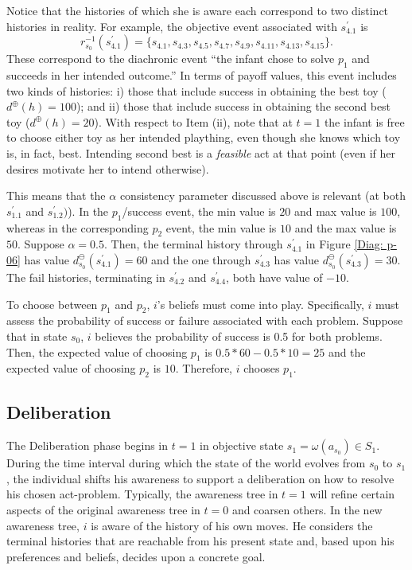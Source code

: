 \documentclass[
11pt,
titlepage,
reqno,
]{article}%
\theoremstyle{definition}
\begin{document}
Notice that the histories of which she is aware each correspond to two distinct histories in reality.
For example, the objective event associated with $s_{4.1}^\prime$ is
\[ 
	r^{-1}_{s_0}(s_{4.1}^\prime)=\{s_{4.1},s_{4.3},s_{4.5},s_{4.7},s_{4.9},s_{4.11},s_{4.13},s_{4.15}\}.
\]
These correspond to the diachronic event ``the infant chose  to solve $p_1$ and succeeds in her intended outcome.''
In terms of payoff values, this event includes two kinds of histories: i) those that include success in obtaining the best toy ($d^\oplus(h)=100$); and ii) those that include success in obtaining the second best toy ($d^\oplus(h)=20$).
With respect to Item (ii), note that at $t=1$ the infant is free to choose either toy as her intended plaything, even though she knows which toy is, in fact, best.
Intending second best is a \textit{feasible} act at that point (even if her desires motivate her to intend otherwise).

This means that the $\alpha$ consistency parameter discussed above is relevant (at both $s^\prime_{1.1}$ and $s^\prime_{1.2})$).
In the  $p_1$/success event, the min value is $20$ and max value is $100$, whereas in the corresponding $p_2$ event, the min value is $10$ and the max value is $50$.
Suppose $\alpha=0.5$. 
Then, the terminal history through $s^\prime_{4.1}$ in Figure \ref{Diag: p-06} has value $d^\ominus_{s_0}(s^\prime_{4.1})=60$ and the one through  $s^\prime_{4.3}$  has value $d^\ominus_{s_0}(s^\prime_{4.3})=30$.
The fail histories, terminating in $s^\prime_{4.2}$ and $s^\prime_{4.4}$,  both have value of $-10$.


To choose between $p_1$ and $p_2$, $i$'s beliefs must come into play.
Specifically, $i$ must assess the probability of success or failure associated with each problem. 
Suppose that in state $s_0$, $i$  believes the probability of success is 0.5 for both problems. 
Then, the expected value of choosing $p_1$ is $0.5*60-0.5*10=25$ and the expected value of choosing $p_2$ is $10$.
Therefore, $i$ chooses $p_1$.


\subsection{Deliberation}
The Deliberation phase begins in $t=1$ in objective state $s_1=\omega(a_{s_0})\in S_1$.
During the time interval during which the state of the world evolves from  $s_0$ to $s_1$, the individual shifts his awareness to support a deliberation on how to resolve his chosen act-problem. 
Typically, the awareness tree in $t=1$ will refine certain aspects of the original awareness tree in $t=0$ and coarsen others.
In the new awareness tree, $i$ is aware of the history of his own moves.
He considers the terminal histories that are reachable from his present state and, based upon his preferences and beliefs, decides upon a concrete goal.
\end{document}
